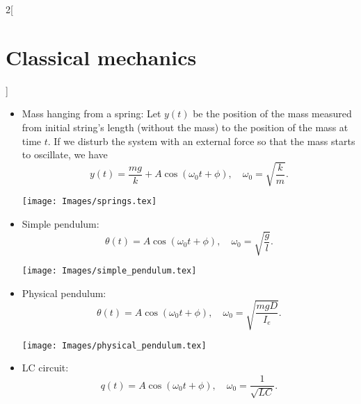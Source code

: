 \documentclass[class=article,10pt,crop=false]{standalone}
\begin{document}
\begin{multicols}{2}[\section{Classical mechanics}]
\begin{concept}
\end{concept}
\begin{concept}[Examples]
\hfill
\begin{itemize}
    \item Mass hanging from a spring: Let $y(t)$ be the position of the mass measured from initial string's length (without the mass) to the position of the mass at time $t$. If we disturb the system with an external force so that the mass starts to oscillate, we have $$y(t)=\frac{mg}{k}+A\cos(\omega_0t+\phi),\quad\omega_0=\sqrt{\frac{k}{m}}.$$
    \begin{minipage}{\linewidth} 
        \centering
        \texttt{[image: Images/springs.tex]} 
    \end{minipage}
    \item Simple pendulum: $$\theta(t)=A\cos(\omega_0t+\phi),\quad\omega_0=\sqrt{\frac{g}{l}}.$$
    \begin{minipage}{\linewidth} 
        \centering
        \texttt{[image: Images/simple\_pendulum.tex]} 
    \end{minipage}
    \item Physical pendulum: 
    $$\theta(t)=A\cos(\omega_0t+\phi),\quad\omega_0=\sqrt{\frac{mgD}{I_e}}.$$
    \begin{minipage}{\linewidth} 
        \centering
        \texttt{[image: Images/physical\_pendulum.tex]} 
    \end{minipage}
    \item LC circuit: $$q(t)=A\cos(\omega_0t+\phi),\quad\omega_0=\frac{1}{\sqrt{LC}}.$$
\end{itemize}
\end{concept}

\end{multicols}
\end{document}
